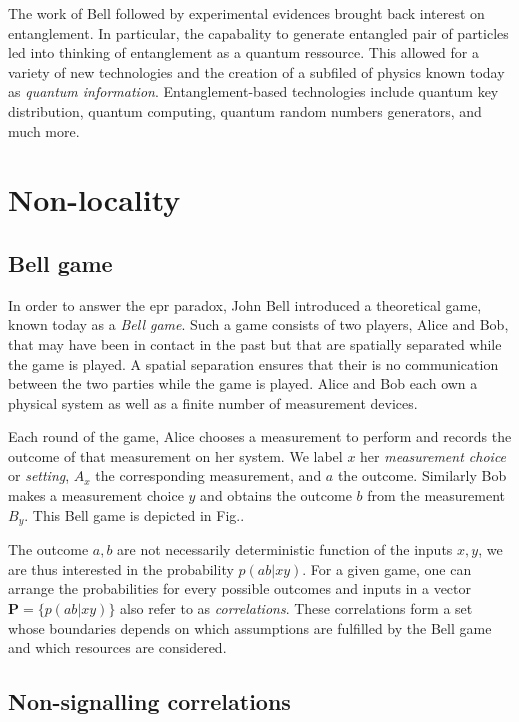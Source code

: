 \medbreak
The work of Bell followed by experimental evidences brought back interest on entanglement.
In particular, the capabality to generate entangled pair of particles led into thinking of entanglement as a quantum ressource.
This allowed for a variety of new technologies and the creation of a subfiled of physics known today as \textit{quantum information}.
Entanglement-based technologies include quantum key distribution, quantum computing, quantum random numbers generators, and much more. 


\chapter{Non-locality}
\label{section:nonlocality}


\section{Bell game}

In order to answer the \acrshort{epr} paradox, John Bell introduced a theoretical game, known today as a \textit{Bell game}.
Such a game consists of two players, Alice and Bob, that may have been in contact in the past but that are spatially separated while the game is played.
A spatial separation ensures that their is no communication between the two parties while the game is played.
Alice and Bob each own a physical system as well as a finite number of measurement devices.

Each round of the game, Alice chooses a measurement to perform and records the outcome of that measurement on her system.
We label $x$ her \textit{measurement choice} or \textit{setting}, $A_x$ the corresponding measurement, and $a$ the outcome.
Similarly Bob makes a measurement choice $y$ and obtains the outcome $b$ from the measurement $B_y$.
This Bell game is depicted in Fig..

The outcome $a,b$ are not necessarily deterministic function of the inputs $x,y$, we are thus interested in the  probability $p(ab|xy)$. 
For a given game, one can arrange the probabilities for every possible outcomes and inputs in a vector $\mathbf{P}=\{ p(ab|xy)\}$ also refer to as \textit{correlations}.
These correlations form a set whose boundaries depends on which assumptions are fulfilled by the Bell game and which resources are considered.


\section{Non-signalling correlations}

